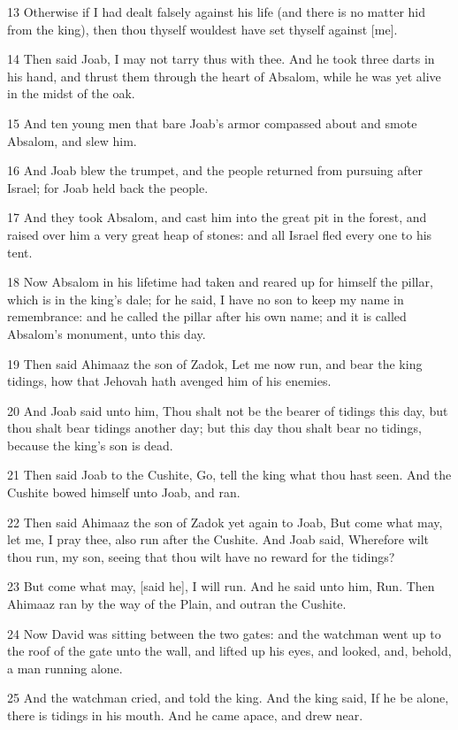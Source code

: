 \par 13 Otherwise if I had dealt falsely against his life (and there is no matter hid from the king), then thou thyself wouldest have set thyself against [me].
\par 14 Then said Joab, I may not tarry thus with thee. And he took three darts in his hand, and thrust them through the heart of Absalom, while he was yet alive in the midst of the oak.
\par 15 And ten young men that bare Joab's armor compassed about and smote Absalom, and slew him.
\par 16 And Joab blew the trumpet, and the people returned from pursuing after Israel; for Joab held back the people.
\par 17 And they took Absalom, and cast him into the great pit in the forest, and raised over him a very great heap of stones: and all Israel fled every one to his tent.
\par 18 Now Absalom in his lifetime had taken and reared up for himself the pillar, which is in the king's dale; for he said, I have no son to keep my name in remembrance: and he called the pillar after his own name; and it is called Absalom's monument, unto this day.
\par 19 Then said Ahimaaz the son of Zadok, Let me now run, and bear the king tidings, how that Jehovah hath avenged him of his enemies.
\par 20 And Joab said unto him, Thou shalt not be the bearer of tidings this day, but thou shalt bear tidings another day; but this day thou shalt bear no tidings, because the king's son is dead.
\par 21 Then said Joab to the Cushite, Go, tell the king what thou hast seen. And the Cushite bowed himself unto Joab, and ran.
\par 22 Then said Ahimaaz the son of Zadok yet again to Joab, But come what may, let me, I pray thee, also run after the Cushite. And Joab said, Wherefore wilt thou run, my son, seeing that thou wilt have no reward for the tidings?
\par 23 But come what may, [said he], I will run. And he said unto him, Run. Then Ahimaaz ran by the way of the Plain, and outran the Cushite.
\par 24 Now David was sitting between the two gates: and the watchman went up to the roof of the gate unto the wall, and lifted up his eyes, and looked, and, behold, a man running alone.
\par 25 And the watchman cried, and told the king. And the king said, If he be alone, there is tidings in his mouth. And he came apace, and drew near.
